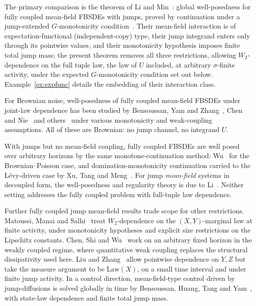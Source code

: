 \documentclass[preprint,12pt]{elsarticle}
\newcommand{\Law}{\mathrm{Law}}
\numberwithin{equation}{section}
\theoremstyle{plain}
\theoremstyle{definition}
\theoremstyle{\PaperRemarkStyle}
\begin{document}
The primary comparison is the theorem of Li and Min~\cite{LiMin}: global well-posedness
for fully coupled mean-field FBSDEs with jumps, proved by continuation under a
jump-extended $G$-monotonicity condition~\cite[(H3.2)]{LiMin}. Their mean-field
interaction is of expectation-functional (independent-copy) type, their jump integrand
enters only through its pointwise values, and their monotonicity hypothesis imposes
finite total jump mass; the present theorem removes all three restrictions, allowing
$W_2$-dependence on the full tuple law, the law of $U$ included, at arbitrary
$\sigma$-finite activity, under the expected $G$-monotonicity condition set out
below. Example~\ref{ex:expfunc} details the embedding of their interaction class.

For Brownian noise, well-posedness of fully coupled mean-field FBSDEs under joint-law
dependence has been studied by Bensoussan, Yam and Zhang~\cite{BYZ}, Chen and
Nie~\cite{ChenNie} and
others~\cite{CarmonaDelarueFBSDE,ChenNieWang,HuaLuo,MinPengQin,TianYu,WuHao,ZhangHuang}
under various monotonicity and weak-coupling assumptions. All of these are Brownian: no
jump channel, no integrand $U$.

With jumps but no mean-field coupling, fully coupled FBSDEs are well posed over arbitrary
horizons by the same monotone-continuation method: Wu~\cite{WuFBSDEP} for the
Brownian--Poisson case, and domination-monotonicity continuation carried to the
L\'evy-driven case by Xu, Tang and Meng~\cite{XuTangMeng}. For jump \emph{mean-field}
systems in decoupled form, the well-posedness and regularity theory is due to
Li~\cite{LiSPA18}. Neither setting addresses the fully coupled problem with full-tuple
law dependence.

Further fully coupled jump mean-field results trade scope for other restrictions.
Matoussi, Manai and Salhi~\cite{MMS} treat $W_2$-dependence on the $(X,Y)$-marginal law
at finite activity, under monotonicity hypotheses and explicit size restrictions on the
Lipschitz constants.
Chen, Shi and Wu~\cite{ChenShiWu} work on an arbitrary fixed horizon in the weakly
coupled regime, where quantitative weak coupling replaces the structural dissipativity
used here. Liu and Zhang~\cite{LiuZhang} allow pointwise dependence on $Y,Z$ but take the
measure argument to be $\Law(X)$, on a small time interval and under finite jump
activity. In a control direction, mean-field-type control driven by jump-diffusions is
solved globally in time by Bensoussan, Huang, Tang and Yam~\cite{BHTY}, with state-law
dependence and finite total jump mass.
\end{document}
